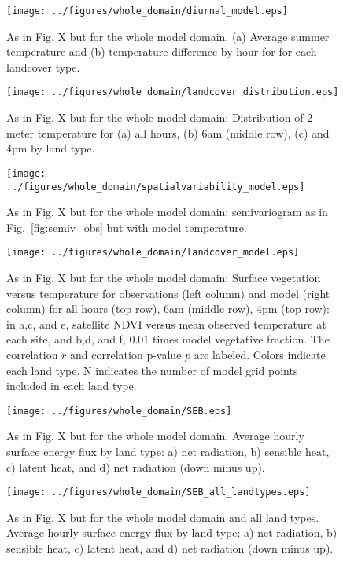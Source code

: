 \documentclass[draft,linenumbers]{agujournal}
\begin{document}
\begin{figure}[h]
\centering
\texttt{[image: ../figures/whole\_domain/diurnal\_model.eps]}
\caption{As in Fig. X but for the whole model domain. (a) Average summer temperature and (b) temperature difference by hour for for each landcover type.}%
\label{fig:diurnal_wd}
\end{figure}

\begin{figure}[h]
\centering
\texttt{[image: ../figures/whole\_domain/landcover\_distribution.eps]}
\caption{As in Fig. X but for the whole model domain: Distribution of 2-meter temperature for (a) all hours, (b) 6am (middle row), (c) and 4pm by land type. }
\label{fig:hist_wd}
\end{figure}

\begin{figure}[h]
\centering
\texttt{[image: ../figures/whole\_domain/spatialvariability\_model.eps]}
\caption{As in Fig. X but for the whole model domain: semivariogram as in Fig.~\ref{fig:semiv_obs} but with model temperature.}
\label{fig:semiv_model_wd}
\end{figure}

\begin{figure}[h]
\centering
\texttt{[image: ../figures/whole\_domain/landcover\_model.eps]}
\caption{As in Fig. X but for the whole model domain:  Surface vegetation versus temperature for observations (left column) and model (right column) for all hours (top row), 6am (middle row), 4pm (top row): in a,c, and e, satellite NDVI versus mean observed temperature at each site, and b,d, and f, 0.01 times model vegetative fraction. The correlation $r$ and correlation p-value $p$ are labeled. Colors indicate each land type. N indicates the number of model grid points included in each land type.}
\label{fig:veg_wd}
\end{figure}

\begin{figure}[h]
\centering
\texttt{[image: ../figures/whole\_domain/SEB.eps]}
\caption{As in Fig. X but for the whole model domain. Average hourly surface energy flux by land type: a) net radiation, b) sensible heat, c) latent heat, and d) net radiation (down minus up).}
\label{fig:seb_wd}
\end{figure}

\begin{figure}[h]
\centering
\texttt{[image: ../figures/whole\_domain/SEB\_all\_landtypes.eps]}
\caption{As in Fig. X but for the whole model domain and all land types. Average hourly surface energy flux by land type: a) net radiation, b) sensible heat, c) latent heat, and d) net radiation (down minus up).}
\label{fig:seb_wd}
\end{figure}
\end{document}
